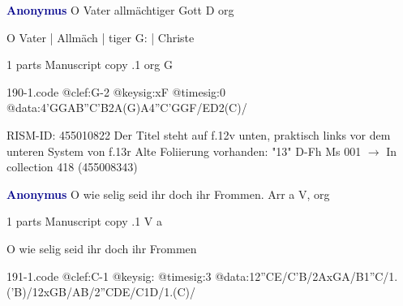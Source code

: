 \documentclass[twocolumn]{book}
\begin{document}
\newline \par \vspace{7pt} \textcolor{darkblue}{\textbf{Anonymus  }}
\newline O Vater allmächtiger Gott  D  
\newline org
\newline \begin{itshape} O Vater | Allmäch | tiger G: | Christe\end{itshape} 
\newline \textcolor{darkblue}{}  1 parts  
\newline Manuscript copy
.1  org  G  
\begin{filecontents*}{190-1.code}
@clef:G-2
@keysig:xF
@timesig:0
@data:4'GGAB''C'B2A(G)A4''C'GGF/ED2(C)/
\end{filecontents*}
\newline
%

\newline RISM-ID: 455010822
\newline Der Titel steht auf f.12v unten, praktisch links vor dem unteren System von f.13r
\newline Alte Foliierung vorhanden: "13"
\newline D-Fh  Ms 001
\newline $\rightarrow$ In collection 418 (455008343)

\newline \par \vspace{7pt} \textcolor{darkblue}{\textbf{Anonymus  }}
\newline O wie selig seid ihr doch ihr Frommen. Arr  a  
\newline V, org
\newline \begin{itshape}\end{itshape} 
\newline \textcolor{darkblue}{}  1 parts  
\newline Manuscript copy
.1  V  a
\newline \begin{footnotesize} O wie selig seid ihr doch ihr Frommen \end{footnotesize}  
\begin{filecontents*}{191-1.code}
@clef:C-1
@keysig:
@timesig:3
@data:12''CE/C'B/2AxGA/B1''C/1.('B)/12xGB/AB/2''CDE/C1D/1.(C)/
\end{filecontents*}
\newline
%
\end{document}
